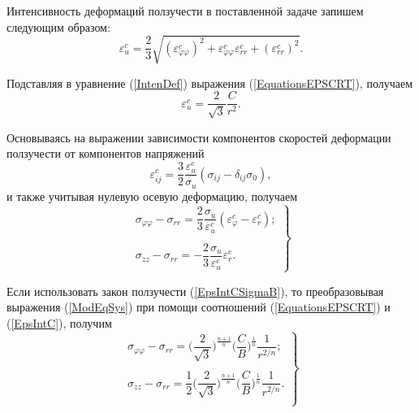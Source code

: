 \documentclass[a4paper,14pt]{extarticle}
\begin{document}
Интенсивность деформаций ползучести в поставленной задаче запишем следующим образом:
\begin{equation}\label{IntenDef}
\varepsilon_{u}^{c}=\dfrac{2}{3}\sqrt{(\varepsilon^{c}_{\varphi\varphi})^{2}+\varepsilon_{\varphi\varphi}^{c}\varepsilon_{rr}^{c}+(\varepsilon_{rr}^{c})^{2}}.
\end{equation}

Подставляя в уравнение (\ref{IntenDef}) выражения (\ref{EquationsEPSCRT}), получаем
\begin{equation}\label{EpsIntC}
\varepsilon_{u}^{c}=\frac{2}{\sqrt{3}}\frac{C}{r^2}.
\end{equation}

Основываясь на выражении зависимости компонентов скоростей деформации ползучести от компонентов напряжений
\begin{equation}
\varepsilon^{c}_{ij}=\dfrac{3}{2}\dfrac{\varepsilon_{u}^{c}}{\sigma_{u}}(\sigma_{ij}-\delta_{ij}\sigma_{0}),
\end{equation}
и также учитывая нулевую осевую деформацию, получаем
\begin{equation}\label{ModEqSys}
\left. \begin{array}{c}
\sigma_{\varphi\varphi}-\sigma_{rr}=\dfrac{2}{3}\dfrac{\sigma_{u}}{\varepsilon_{u}^{c}}(\varepsilon_{\varphi}^{c}-\varepsilon_{r}^{c}); \\
\\
\sigma_{zz}-\sigma_{rr}=-\dfrac{2}{3}\dfrac{\sigma_{u}}{\varepsilon_{u}^{c}}\varepsilon_{r}^{c}.
\end{array}\right\}
\end{equation}

Если использовать закон ползучести (\ref{EpsIntCSigmaB}), то преобразовывая выражения (\ref{ModEqSys}) при помощи соотношений (\ref{EquationsEPSCRT}) и (\ref{EpsIntC}), получим
\begin{equation}\label{SystemSigma}
\left. \begin{array}{c} 
\sigma_{\varphi\varphi}-\sigma_{rr}=\bigg(\dfrac{2}{\sqrt{3}}\bigg)^{\tfrac{n+1}{n}} \bigg(\dfrac{C}{B}\bigg)^{\tfrac{1}{n}}\dfrac{1}{r^{2/n}}; \\
\\
\sigma_{zz}-\sigma_{rr}=\dfrac{1}{2}\bigg(\dfrac{2}{\sqrt{3}}\bigg)^{\tfrac{n+1}{n}} \bigg(\dfrac{C}{B}\bigg)^{\tfrac{1}{n}}\dfrac{1}{r^{2/n}}. \\
\end{array}\right\}
\end{equation}
\end{document}
